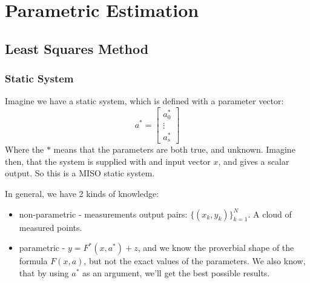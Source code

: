 
\chapter{Parametric Estimation}
\section{Least Squares Method}
\subsection{Static System}
Imagine we have a static system, which is defined with a parameter vector:
\begin{equation}
    a^{*}= \begin{bmatrix}
        a_0^{*} \\
        \vdots\\
        a_s^{*}
    \end{bmatrix}
\end{equation}
Where the $*$ means that the parameters are both true, and unknown.
Imagine then, that the system is supplied with and input vector $x$, and gives a scalar output. So this is a MISO static system.
\\
{
    In general, we have 2 kinds of knowledge:
    \begin{itemize}
        \item non-parametric - measurements output pairs: $\{(x_k,y_k)\}_{k=1}^{N}$. A cloud of measured points.
        \item parametric - $y = F^{*}(x,a^{*})+z$, and we know the proverbial shape of the formula $F(x,a)$, but not the exact values of the parameters. We also know, that by using $a^{*}$ as an argument, we'll get the best possible results.
    \end{itemize}
}

